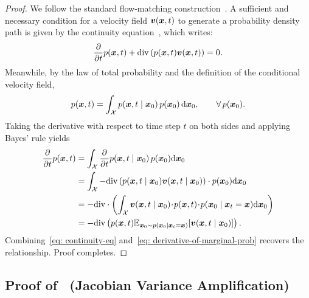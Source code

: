 \begin{appendices}
    \begin{proof}
        We follow the standard flow-matching construction~\cite{lipman2023flowmatchinggenerativemodeling,tong2024improvinggeneralizingflowbasedgenerative}. A sufficient and necessary condition for a velocity field ${\bm{v}}({\bm{x}},t)$ to generate a probability density path is given by the continuity equation~\cite{villani2009optimaltransport}, which writes:
        \begin{equation}
            \frac{\partial}{\partial{t}}p({\bm{x}},t)+\mathrm{div}\left(p({\bm{x}},t){\bm{v}}({\bm{x}},t)\right)=0.
            \label{eq: continuity-eq}
        \end{equation}
        Meanwhile, by the law of total probability and the definition of the conditional velocity field,
        \begin{equation}
            p({\bm{x}},t)=\int_{{\mathcal{X}}}p({\bm{x}},t\mid{\bm{x}}_{0})\,p({\bm{x}}_{0})\,\mathrm{d}{\bm{x}}_{0},\qquad\forall\,p({\bm{x}}_{0}).
        \end{equation}
        Taking the derivative with respect to time step $t$ on both sides and applying Bayes' rule yields
        \begin{equation}
            \begin{aligned}
                \frac{\partial}{\partial{t}}p({\bm{x}},t)
                &=\int_{{\mathcal{X}}}\frac{\partial}{\partial{t}}p({\bm{x}},t\mid{{\bm{x}}_{0}})\,p({\bm{x}}_{0})\mathrm{d}{\bm{x}}_{0}\\
                &=\int_{{\mathcal{X}}}-\mathrm{div}\left(p({\bm{x}},t\mid{{\bm{x}}_{0}}){\bm{v}}({\bm{x}},t\mid{{\bm{x}}_{0}})\right)\cdot p({\bm{x}}_{0})\mathrm{d}{\bm{x}}_{0}\\
                &=-\mathrm{div}\cdot\left(\int_{{\mathcal{X}}}{\bm{v}}({\bm{x}},t\mid{{\bm{x}}_{0}})\!\cdot\!p({\bm{x}},t)\!\cdot\!p({\bm{x}}_{0}\mid{{\bm{x}}_{t}={\bm{x}}})\mathrm{d}\boldsymbol{x}_{0}\right)\\
                &=-\mathrm{div}\left(p({\bm{x}},t)\mathbb{E}_{{\bm{x}}_{0}\sim{p({\bm{x}}_{0}\mid{\bm{x}}_{t}={\bm{x}})}}\!\left[{\bm{v}}({\bm{x}},t\mid{\bm{x}}_{0})\right]\right).
            \end{aligned}
            \label{eq: derivative-of-marginal-prob}
        \end{equation}
        Combining~\eqref{eq: continuity-eq} and~\eqref{eq: derivative-of-marginal-prob} recovers the relationship. Proof completes.
    \end{proof}

    \subsection{Proof of~ (Jacobian Variance Amplification)}


\end{appendices}

